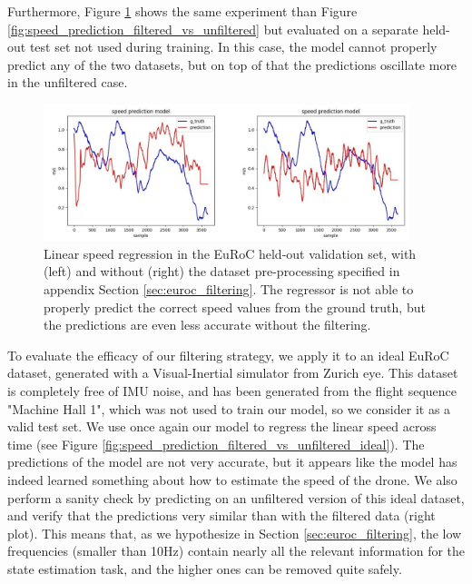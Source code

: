 Furthermore, Figure \ref{fig:speed_prediction_filtered_vs_unfiltered_validation} shows the same experiment than Figure \ref{fig:speed_prediction_filtered_vs_unfiltered} but evaluated on a separate held-out test set not used during training.
In this case, the model cannot properly predict any of the two datasets, but on top of that the predictions oscillate more in the unfiltered case.

\begin{figure}[h]
   \centering
   \includegraphics[width=0.95\textwidth]{thesis_template/img/speed_prediction_validation_filtered_vs_unfiltered.jpeg}
   \caption{Linear speed regression in the EuRoC held-out validation set, with (left) and without (right) the dataset pre-processing specified in appendix Section \ref{sec:euroc_filtering}.
   The regressor is not able to properly predict the correct speed values from the ground truth, but the predictions are even less accurate without the filtering.}
   \label{fig:speed_prediction_filtered_vs_unfiltered_validation}
\end{figure}

To evaluate the efficacy of our filtering strategy, we apply it to an ideal EuRoC dataset, generated with a Visual-Inertial simulator from Zurich eye. 
This dataset is completely free of IMU noise, and has been generated from the flight sequence "Machine Hall 1", which was not used to train our model, so we consider it as a valid test set.
We use once again our model to regress the linear speed across time (see Figure \ref{fig:speed_prediction_filtered_vs_unfiltered_ideal}).
The predictions of the model are not very accurate, but it appears like the model has indeed learned something about how to estimate the speed of the drone.
We also perform a sanity check by predicting on an unfiltered version of this ideal dataset, and verify that the predictions very similar than with the filtered data (right plot).
This means that, as we hypothesize in Section \ref{sec:euroc_filtering}, the low frequencies (smaller than 10Hz) contain nearly all the relevant information for the state estimation task, and the higher ones can be removed quite safely.

